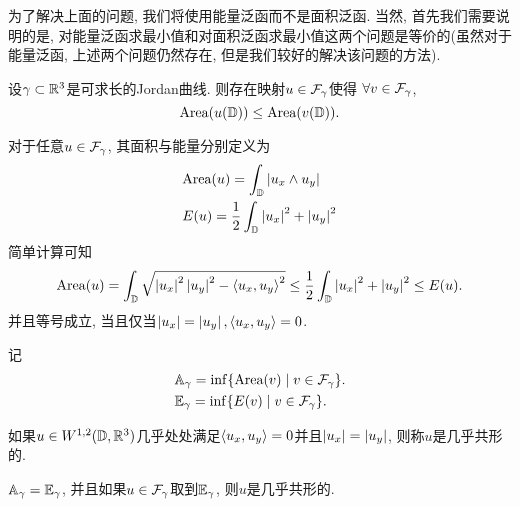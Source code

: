 为了解决上面的问题, 我们将使用能量泛函而不是面积泛函. 当然, 首先我们需要说明的是, 对能量泛函求最小值和对面积泛函求最小值这两个问题是等价的(虽然对于能量泛函, 上述两个问题仍然存在, 但是我们较好的解决该问题的方法).
\begin{theorem} \label{plateau_problem}
    设$\gamma \subset \mathbb{R}^3$是可求长的Jordan曲线. 则存在映射$u \in {\mathcal{F}_\gamma}$使得 $\forall v \in {\mathcal{F}_\gamma}$, 
    \begin{equation}
        \text{Area}(u({\mathbb{D}}))\le \text{Area}(v({\mathbb{D}})).
    \end{equation}
\end{theorem}
对于任意$u \in {\mathcal{F}_\gamma}$, 其面积与能量分别定义为
\begin{align}
    &\text{Area}(u)=\int_{\mathbb{D}}\left | u_x\wedge u_y \right | \\
    &{E}(u)=\frac{1}{2}\int_{\mathbb{D}}\left | u_x \right |^2+\left | u_y \right |^2
\end{align}
简单计算可知
\begin{equation}\label{AleE}
    \text{Area}(u)=\int_{\mathbb{D}} \sqrt{\left | u_x \right |^2\left | u_y \right |^2-{\left < u_x, u_y \right >}^2} \le \frac{1}{2}\int_{\mathbb{D}} \left | u_x \right |^2+\left | u_y \right |^2 \le{E}(u).
\end{equation}
并且等号成立, 当且仅当$\left | u_x \right |=\left | u_y \right |, {\left < u_x, u_y \right >}=0$.
\par 记
\begin{align}
    &{\mathbb{A}_\gamma}=\inf\{\text{Area}(v)\mid v \in {\mathcal{F}_\gamma}\}.\\
    &{\mathbb{E}_\gamma}=\inf \{{E}(v)\mid v \in {\mathcal{F}_\gamma}\}.
\end{align}
\begin{definition}
    如果$u \in W^{1,2}(\mathbb{D},\mathbb{R}^3)$几乎处处满足${\left < u_x, u_y \right >}=0$并且$\left | u_x \right | = \left | u_y \right |$, 则称$u$是几乎共形的.
\end{definition}
\begin{lemma}
    ${\mathbb{A}_\gamma}={\mathbb{E}_\gamma}$, 并且如果$u \in {\mathcal{F}_\gamma}$取到${\mathbb{E}_\gamma}$, 则$u$是几乎共形的.
\end{lemma}
